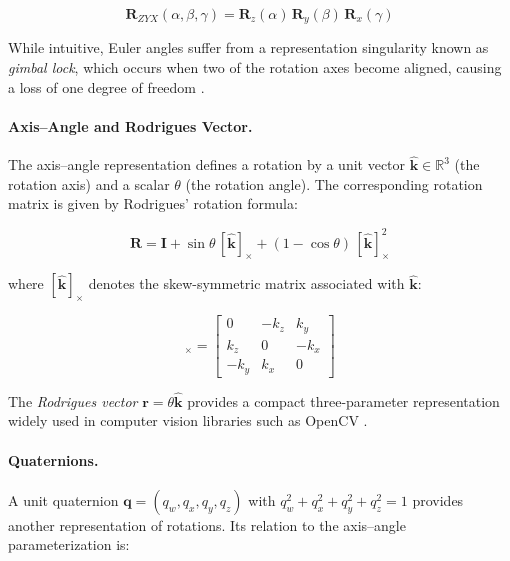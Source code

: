 \begin{equation}
    \mathbf{R}_{ZYX}(\alpha,\beta,\gamma) =
    \mathbf{R}_z(\alpha)\,\mathbf{R}_y(\beta)\,\mathbf{R}_x(\gamma)
    \label{eq:euler}
\end{equation}

\noindent While intuitive, Euler angles suffer from a representation singularity
known as \textit{gimbal lock}, which occurs when two of the rotation axes become
aligned, causing a loss of one degree of freedom \cite{craig2005introduction}.

\paragraph{Axis--Angle and Rodrigues Vector.}
The axis--angle representation defines a rotation by a unit vector
$\hat{\mathbf{k}} \in \mathbb{R}^3$ (the rotation axis) and a scalar $\theta$
(the rotation angle). The corresponding rotation matrix is given by
Rodrigues' rotation formula:

\begin{equation}
    \mathbf{R} = \mathbf{I} + \sin\theta\,[\hat{\mathbf{k}}]_{\times}
    + (1 - \cos\theta)\,[\hat{\mathbf{k}}]_{\times}^2
    \label{eq:rodrigues}
\end{equation}

\noindent where $[\hat{\mathbf{k}}]_{\times}$ denotes the skew-symmetric matrix
associated with $\hat{\mathbf{k}}$:

\begin{equation}
    [\hat{\mathbf{k}}]_{\times} =
    \begin{bmatrix}
        0 & -k_z & k_y \\
        k_z & 0 & -k_x \\
        -k_y & k_x & 0
    \end{bmatrix}
    \label{eq:skew}
\end{equation}

\noindent The \textit{Rodrigues vector} $\mathbf{r} = \theta\hat{\mathbf{k}}$
provides a compact three-parameter representation widely used in computer vision
libraries such as OpenCV \cite{bradski2008learning}.

\paragraph{Quaternions.}
A unit quaternion $\mathbf{q} = (q_w, q_x, q_y, q_z)$ with
$q_w^2 + q_x^2 + q_y^2 + q_z^2 = 1$ provides another representation of
rotations. Its relation to the axis--angle parameterization is:

